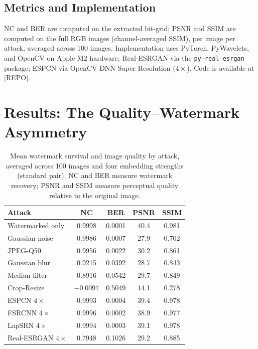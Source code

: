 \documentclass[conference]{IEEEtran}
\begin{document}
\subsection{Metrics and Implementation}
NC and BER are computed on the extracted bit-grid; PSNR and SSIM
\cite{ssim2004} are computed on the full RGB images (channel-averaged
SSIM), per image per attack, averaged across 100 images. Implementation uses
PyTorch, PyWavelets, and OpenCV on Apple M2 hardware; Real-ESRGAN via
the \texttt{py-real-esrgan} package; ESPCN via OpenCV DNN
Super-Resolution ($4\times$). Code is available at [REPO].

\section{Results: The Quality--Watermark Asymmetry}
\label{sec:results}

\begin{table}[t]
\caption{Mean watermark survival and image quality by attack, averaged
across 100 images and four embedding strengths (standard pair). NC and
BER measure watermark recovery; PSNR and SSIM measure perceptual
quality relative to the original image.}
\label{tab:survival}
\centering
\begin{tabular}{lcccc}
\toprule
Attack & NC & BER & PSNR & SSIM \\
\midrule
Watermarked only       & 0.9998  & 0.0001 & 40.4 & 0.981 \\
Gaussian noise         & 0.9986  & 0.0007 & 27.9 & 0.702 \\
JPEG-Q50               & 0.9956  & 0.0022 & 30.2 & 0.861 \\
Gaussian blur          & 0.9215  & 0.0392 & 28.7 & 0.843 \\
Median filter          & 0.8916  & 0.0542 & 29.7 & 0.849 \\
Crop-Resize            & $-0.0097$ & 0.5049 & 14.1 & 0.278 \\
ESPCN $4\times$        & 0.9993  & 0.0004 & 39.4 & 0.978 \\
FSRCNN $4\times$       & 0.9996  & 0.0002 & 38.9 & 0.977 \\
LapSRN $4\times$       & 0.9994  & 0.0003 & 39.1 & 0.978 \\
Real-ESRGAN $4\times$  & 0.7948  & 0.1026 & 29.2 & 0.885 \\
\bottomrule
\end{tabular}
\end{table}
\end{document}

